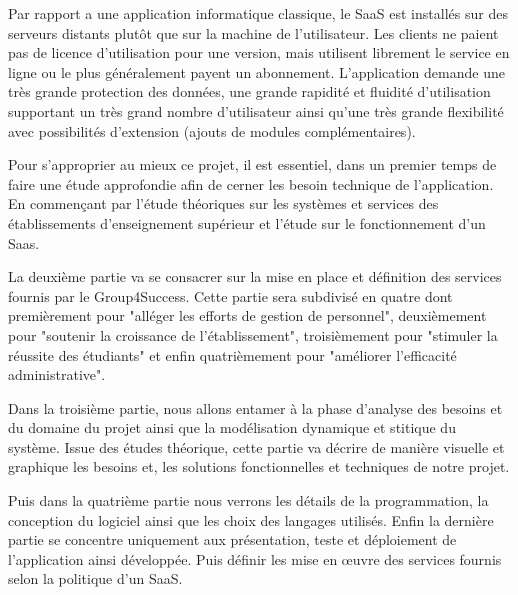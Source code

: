Par rapport a une application informatique classique, le SaaS est installés sur des serveurs distants plutôt que sur la machine de l'utilisateur. Les clients ne paient pas de licence d'utilisation pour une version, mais utilisent librement le service en ligne ou le plus généralement payent un abonnement. L'application demande une très grande protection des données, une grande rapidité et fluidité d'utilisation supportant un très grand nombre d'utilisateur ainsi qu'une très grande flexibilité avec possibilités d'extension (ajouts de modules complémentaires).
\medskip

Pour s'approprier au mieux ce projet, il est essentiel, dans un premier temps de faire une étude approfondie afin de cerner les besoin technique de l'application. En commençant par l'étude théoriques sur les systèmes et services des établissements d'enseignement supérieur et l'étude sur le fonctionnement d'un Saas.
\medskip

La deuxième partie va se consacrer sur la mise en place et définition des services fournis par le Group4Success. Cette partie sera subdivisé en quatre dont premièrement pour "alléger les efforts de gestion de personnel", deuxièmement pour "soutenir la croissance de l'établissement", troisièmement pour "stimuler la réussite des étudiants" et enfin quatrièmement pour "améliorer l'efficacité administrative".
\medskip

Dans la troisième partie, nous allons entamer à la phase d'analyse des besoins et du domaine du projet ainsi que la modélisation dynamique et stitique du système. Issue des études théorique, cette partie va décrire de manière visuelle et graphique les besoins et, les solutions fonctionnelles et techniques de notre projet.
\medskip

Puis dans la quatrième partie nous verrons les détails de la programmation, la conception du logiciel ainsi que les choix des langages utilisés. Enfin la dernière partie se concentre uniquement aux présentation, teste et déploiement de l'application ainsi développée. Puis définir les mise en œuvre des services fournis selon la politique d'un SaaS.



